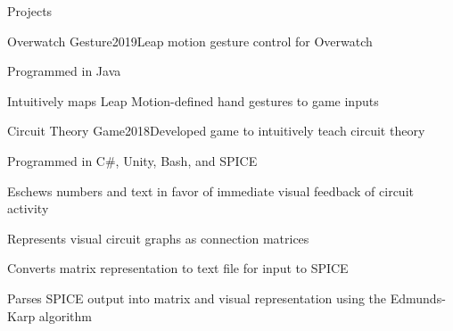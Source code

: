 \documentclass{resume} %
\begin{document}
\begin{rSection}{Projects}

\begin{rWorkSubsection}{Overwatch Gesture}{2019}{Leap motion gesture control for Overwatch}{}
\item Programmed in Java
\item Intuitively maps Leap Motion-defined hand gestures to game inputs
\end{rWorkSubsection}
\fi

\begin{rWorkSubsection}{Circuit Theory Game}{2018}{Developed game to intuitively teach circuit theory}{}
\item Programmed in C\#, Unity, Bash, and SPICE
\item Eschews numbers and text in favor of immediate visual feedback of circuit activity
\item Represents visual circuit graphs as connection matrices
\item Converts matrix representation to text file for input to SPICE
\item Parses SPICE output into matrix and visual representation using the Edmunds-Karp algorithm
\end{rWorkSubsection}

\iffalse
\begin{rWorkSubsection}{Gettysburg Soccer Academy}{2014}{}{}
\item 
\end{rWorkSubsection}


\begin{rWorkSubsection}{Ethical H2O}{2016}{}{}
\item 
\end{rWorkSubsection}


\begin{rWorkSubsection}{Wind Turbine Construction}{2017}{}{}
\item 
\end{rWorkSubsection}
\fi
\end{rSection}

\end{document}
